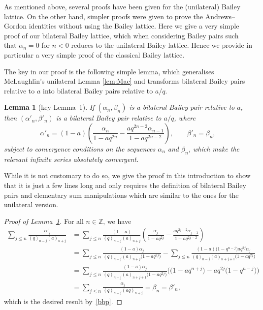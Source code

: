 \documentclass[11pt]{article}
\numberwithin{equation}{section}
\newtheorem{Lemma}[Theorem]{Lemma}
\begin{document}
As mentioned above, several proofs have been given for the (unilateral) Bailey lattice. On the other hand, simpler proofs were given to prove the Andrews--Gordon identities without using the Bailey lattice. Here we give a very simple proof of our bilateral Bailey lattice, which when considering Bailey pairs such that $\alpha_n=0$ for $n<0$ reduces to the unilateral Bailey lattice. Hence we provide in particular a very simple proof of the classical Bailey lattice.

The key in our proof is the following simple lemma, which generalises McLaughlin's unilateral Lemma \ref{lem:Mac} and transforms bilateral Bailey pairs relative to $a$ into bilateral Bailey pairs relative to $a/q$.
\begin{Lemma}[key Lemma~1]\label{lem:key1}
If $(\alpha_n, \beta_n)$ is a bilateral Bailey pair relative to $a$, then $(\alpha'_n, \beta'_n)$ is a bilateral Bailey pair relative to $a/q$, where
\begin{equation}\label{eq:baileylattice1}
\alpha'_n=(1-a)\left(\frac{\alpha_n}{1-aq^{2n}}-\frac{aq^{2n-2}\alpha_{n-1}}{1-aq^{2n-2}}\right), \qquad \beta'_n=\beta_n,
\end{equation}
subject to convergence conditions on the sequences $\alpha_n$ and $\beta_n$, which make the relevant infinite series absolutely convergent.
\end{Lemma}
While it is not customary to do so, we give the proof in this introduction to show that it is just a few lines long and only requires the definition of bilateral Bailey pairs and elementary sum manipulations which are similar to the ones for the unilateral version.
\begin{proof}[Proof of Lemma~\ref{lem:key1}]
For all $n\in\mathbb{Z}$, we have
\begin{align*}
\sum_{j\leq n} \frac{\alpha'_j}{(q)_{n-j}(a)_{n+j}}&= \sum_{j\leq n} \frac{(1-a)}{(q)_{n-j}(a)_{n+j}}\left(\frac{\alpha_j}{1-aq^{2j}}-\frac{aq^{2j-2}\alpha_{j-1}}{1-aq^{2j-2}}\right)\\
&= \sum_{j\leq n} \frac{(1-a)\alpha_j}{(q)_{n-j}(a)_{n+j}\bigl(1-aq^{2j}\bigr)}-\sum_{j\leq n} \frac{(1-a)\bigl(1-q^{n-j}\bigr)aq^{2j}\alpha_{j}}{(q)_{n-j}(a)_{n+j+1}\bigl(1-aq^{2j}\bigr)}\\
&=\sum_{j\leq n} \frac{(1-a)\alpha_j}{(q)_{n-j}(a)_{n+j+1}\bigl(1-aq^{2j}\bigr)}\bigl(\bigl(1-aq^{n+j}\bigr)-aq^{2j}\bigl(1-q^{n-j}\bigr)\bigr)\\
&=\sum_{j\leq n} \frac{\alpha_j}{(q)_{n-j}(aq)_{n+j}}=\beta_n=\beta'_n,
\end{align*}
which is the desired result by~\eqref{bbp}.
\end{proof}
\end{document}
